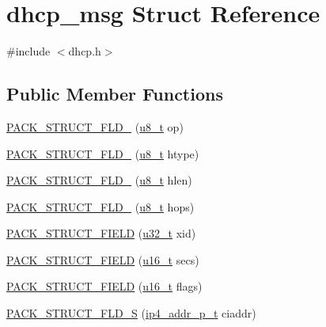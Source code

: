 \hypertarget{structdhcp__msg}{}\section{dhcp\+\_\+msg Struct Reference}
\label{structdhcp__msg}


{\ttfamily \#include $<$dhcp.\+h$>$}

\subsection*{Public Member Functions}
\begin{DoxyCompactItemize}
\item 
\hyperlink{structdhcp__msg_a4767f765a467152d48153a7d1f05c5b3}{P\+A\+C\+K\+\_\+\+S\+T\+R\+U\+C\+T\+\_\+\+F\+L\+D\+\_} (\hyperlink{group__compiler__abstraction_ga4caecabca98b43919dd11be1c0d4cd8e}{u8\+\_\+t} op)
\item 
\hyperlink{structdhcp__msg_a6f499a0e2367bc665327c6e924db1c84}{P\+A\+C\+K\+\_\+\+S\+T\+R\+U\+C\+T\+\_\+\+F\+L\+D\+\_} (\hyperlink{group__compiler__abstraction_ga4caecabca98b43919dd11be1c0d4cd8e}{u8\+\_\+t} htype)
\item 
\hyperlink{structdhcp__msg_a1e357a1c4a76ea5f5f1dae1b716003d9}{P\+A\+C\+K\+\_\+\+S\+T\+R\+U\+C\+T\+\_\+\+F\+L\+D\+\_} (\hyperlink{group__compiler__abstraction_ga4caecabca98b43919dd11be1c0d4cd8e}{u8\+\_\+t} hlen)
\item 
\hyperlink{structdhcp__msg_afdd8c2585f5e68071d75b77376f4d844}{P\+A\+C\+K\+\_\+\+S\+T\+R\+U\+C\+T\+\_\+\+F\+L\+D\+\_} (\hyperlink{group__compiler__abstraction_ga4caecabca98b43919dd11be1c0d4cd8e}{u8\+\_\+t} hops)
\item 
\hyperlink{structdhcp__msg_accc488cabd8c68c9b0fb32fd348ede34}{P\+A\+C\+K\+\_\+\+S\+T\+R\+U\+C\+T\+\_\+\+F\+I\+E\+LD} (\hyperlink{group__compiler__abstraction_ga4c14294869aceba3ef9d4c0c302d0f33}{u32\+\_\+t} xid)
\item 
\hyperlink{structdhcp__msg_a1579df9397d7c34905ad94fa6b5962e1}{P\+A\+C\+K\+\_\+\+S\+T\+R\+U\+C\+T\+\_\+\+F\+I\+E\+LD} (\hyperlink{group__compiler__abstraction_ga77570ac4fcab86864fa1916e55676da2}{u16\+\_\+t} secs)
\item 
\hyperlink{structdhcp__msg_a8ba3547dfd4a1ef3e96eaf5a88321c46}{P\+A\+C\+K\+\_\+\+S\+T\+R\+U\+C\+T\+\_\+\+F\+I\+E\+LD} (\hyperlink{group__compiler__abstraction_ga77570ac4fcab86864fa1916e55676da2}{u16\+\_\+t} flags)
\item 
\hyperlink{structdhcp__msg_a1b1e3b64cb761605e306dff17be06b5e}{P\+A\+C\+K\+\_\+\+S\+T\+R\+U\+C\+T\+\_\+\+F\+L\+D\+\_\+S} (\hyperlink{native_2lwip_2src_2include_2lwip_2prot_2ip4_8h_ae5011654fcbadf6b6582b8d49446107f}{ip4\+\_\+addr\+\_\+p\+\_\+t} ciaddr)

\end{DoxyCompactItemize}
